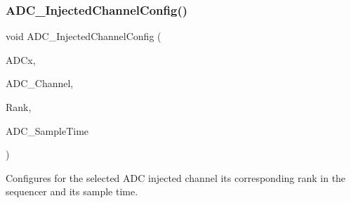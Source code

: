 \subsubsection{A\+D\+C\+\_\+\+Injected\+Channel\+Config()}
{\footnotesize\ttfamily void A\+D\+C\+\_\+\+Injected\+Channel\+Config (\begin{DoxyParamCaption}\item[{\textbf{ A\+D\+C\+\_\+\+Type\+Def} $\ast$}]{A\+D\+Cx,  }\item[{uint8\+\_\+t}]{A\+D\+C\+\_\+\+Channel,  }\item[{uint8\+\_\+t}]{Rank,  }\item[{uint8\+\_\+t}]{A\+D\+C\+\_\+\+Sample\+Time }\end{DoxyParamCaption})}



Configures for the selected A\+DC injected channel its corresponding rank in the sequencer and its sample time. 


